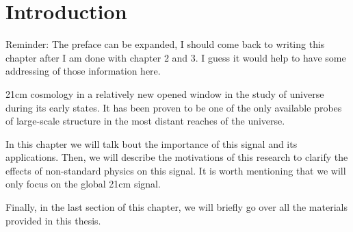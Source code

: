 \documentclass[12pt, TexShade, letterpaper]{report}
\begin{document}
\chapter{Introduction}
\label{chap:intro}
Reminder: The preface can be expanded, I should come back to writing this chapter after I am done with chapter 2 and 3. I guess it would help to have some addressing of those information here. \par
21cm cosmology in a relatively new opened window in the study of universe during its early states. It has been proven to be one of the only available probes of large-scale structure in the most distant reaches of the universe\cite{primordial_universe}.\par
In this chapter we will talk bout the importance of this signal and its applications. Then, we will describe the motivations of this research to clarify the effects of non-standard physics on this signal. It is worth mentioning that we will only focus on the global 21cm signal.\par
Finally, in the last section of this chapter, we will briefly go over all the materials provided in this thesis.\par
\end{document}
